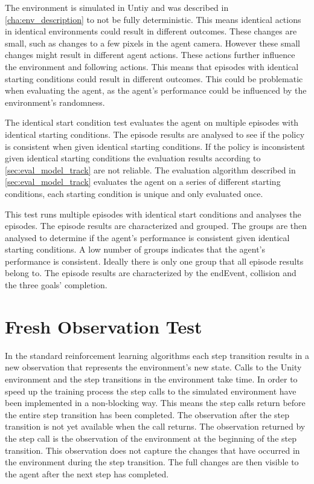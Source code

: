 The environment is simulated in Untiy and was described in \ref{cha:env_description} to not be fully deterministic. This means identical actions in identical environments could result in different outcomes. These changes are small, such as changes to a few pixels in the agent camera. However these small changes might result in different agent actions. These actions further influence the environment and following actions. This means that episodes with identical starting conditions could result in different outcomes. This could be problematic when evaluating the agent, as the agent's performance could be influenced by the environment's randomness. 

The identical start condition test evaluates the agent on multiple episodes with identical starting conditions. The episode results are analysed to see if the policy is consistent when given identical starting conditions. If the policy is inconsistent given identical starting conditions the evaluation results according to \ref{sec:eval_model_track} are not reliable. The evaluation algorithm described in \ref{sec:eval_model_track} evaluates the agent on a series of different starting conditions, each starting condition is unique and only evaluated once.

This test runs multiple episodes with identical start conditions and analyses the episodes. The episode results are characterized and grouped. The groups are then analysed to determine if the agent's performance is consistent given identical starting conditions. A low number of groups indicates that the agent's performance is consistent. Ideally there is only one group that all episode results belong to.
The episode results are characterized by the endEvent, collision and the three goals' completion.



\section{Fresh Observation Test}

In the standard reinforcement learning algorithms each step transition results in a new observation that represents the environment's new state. Calls to the Unity environment and the step transitions in the environment take time. In order to speed up the training process the step calls to the simulated environment have been implemented in a non-blocking way. This means the step calls return before the entire step transition has been completed. The observation after the step transition is not yet available when the call returns. The observation returned by the step call is the observation of the environment at the beginning of the step transition. This observation does not capture the changes that have occurred in the environment during the step transition. The full changes are then visible to the agent after the next step has completed. 

